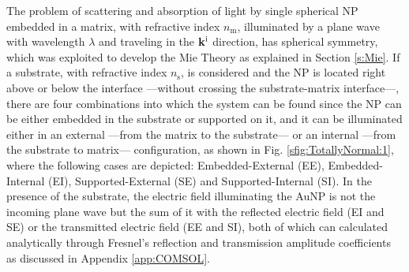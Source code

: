 
The problem of scattering and absorption of light by single spherical NP embedded in a matrix, with refractive index $n_\text{m}$, illuminated by a plane wave with wavelength $\lambda$  and traveling in the  $\vb{k}^\text{i}$ direction, has spherical symmetry, which was exploited to develop the Mie Theory as explained in Section \ref{s:Mie}. If a substrate, with refractive index $n_\text{s}$, is considered and the NP is located right above or below the interface ---without crossing the substrate-matrix interface---, there are four combinations into which the system can be found since the NP can be either embedded  in the substrate or supported on it, and it can be illuminated either in an external ---from the matrix to the substrate--- or an internal ---from the substrate to matrix--- configuration, as shown in Fig. \ref{sfig:TotallyNormal:1}, where the following cases are depicted: Embedded-External (EE), Embedded-Internal (EI), Supported-External (SE) and Supported-Internal (SI). In the  presence of the substrate, the electric field illuminating the AuNP is not the incoming plane wave but the sum of it with the reflected electric field (EI and SE) or the transmitted electric field (EE and SI), both of which can calculated analytically through Fresnel's reflection and transmission amplitude coefficients as discussed in Appendix \ref{app:COMSOL}.

